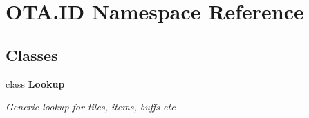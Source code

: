 \hypertarget{namespace_o_t_a_1_1_i_d}{}\section{O\+T\+A.\+I\+D Namespace Reference}
\label{namespace_o_t_a_1_1_i_d}
\subsection*{Classes}
\begin{DoxyCompactItemize}
\item 
class {\bfseries Lookup}
\begin{DoxyCompactList}\small\item\em Generic lookup for tiles, items, buffs etc \end{DoxyCompactList}\end{DoxyCompactItemize}
